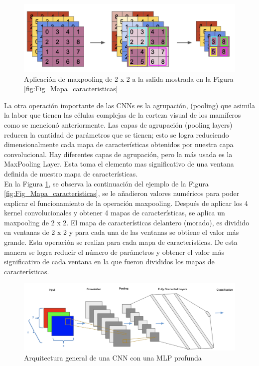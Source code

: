 \begin{onehalfspacing}
\begin{figure}[th]
	\centering
	\includegraphics[width=14cm,keepaspectratio]{XX_Figures/Fig_Maxpooling.png}
	\caption{\footnotesize Aplicación de maxpooling de 2 x 2 a la salida mostrada en la Figura \ref{fig:Fig_Mapa_caracteristicas}}
	\label{fig:Fig_Maxpooling}
\end{figure}

La otra operación importante de las CNNs es la agrupación, (pooling) que asimila la labor que tienen las células complejas de la corteza visual de los mamíferos como se mencionó anteriormente. Las capas de agrupación (pooling layers) reducen la cantidad de parámetros que se tienen; esto se logra reduciendo dimensionalmente cada mapa de características obtenidos por nuestra capa convolucional. Hay diferentes capas de agrupación, pero la más usada es la MaxPooling Layer. Esta toma el elemento mas significativo de una ventana definida de nuestro mapa de características.\\

En la Figura \ref{fig:Fig_Maxpooling}, se observa la continuación del ejemplo de la Figura \ref{fig:Fig_Mapa_caracteristicas}, se le añadieron valores numéricos para poder explicar el funcionamiento de la operación maxpooling. Después de aplicar los 4 kernel convolucionales y obtener 4 mapas de características, se aplica un maxpooling de 2 x 2. El mapa de características delantero (morado), es dividido en ventanas de 2 x 2 y para cada una de las ventanas se obtiene el valor más grande. Esta operación se realiza para cada mapa de características. De esta manera se logra reducir el número de parámetros y obtener el valor más significativo de cada ventana en la que fueron divididos los mapas de características.

\begin{figure}[th]
	\centering
	\includegraphics[width=16cm,keepaspectratio]{XX_Figures/Fig_CNN_Arquitecture.png}
	\caption{\footnotesize Arquitectura general de una CNN con una MLP profunda}
	\label{fig:Fig_CNN_Arquitecture}
\end{figure}


\end{onehalfspacing}
